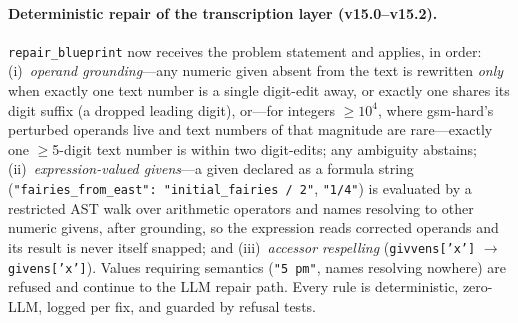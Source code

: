 \documentclass[11pt,a4paper]{article}
\begin{document}
\paragraph{Deterministic repair of the transcription layer (v15.0--v15.2).}
\texttt{repair\_blueprint} now receives the problem statement and applies, in order: (i)~\emph{operand grounding}---any numeric given absent from the text is rewritten \emph{only} when exactly one text number is a single digit-edit away, or exactly one shares its digit suffix (a dropped leading digit), or---for integers $\geq 10^4$, where gsm-hard's perturbed operands live and text numbers of that magnitude are rare---exactly one $\geq$5-digit text number is within two digit-edits; any ambiguity abstains; (ii)~\emph{expression-valued givens}---a given declared as a formula string (\texttt{"fairies\_from\_east": "initial\_fairies / 2"}, \texttt{"1/4"}) is evaluated by a restricted AST walk over arithmetic operators and names resolving to other numeric givens, after grounding, so the expression reads corrected operands and its result is never itself snapped; and (iii)~\emph{accessor respelling} (\texttt{givvens['x']} $\to$ \texttt{givens['x']}).
Values requiring semantics (\texttt{"5 pm"}, names resolving nowhere) are refused and continue to the LLM repair path.
Every rule is deterministic, zero-LLM, logged per fix, and guarded by refusal tests.
\end{document}
